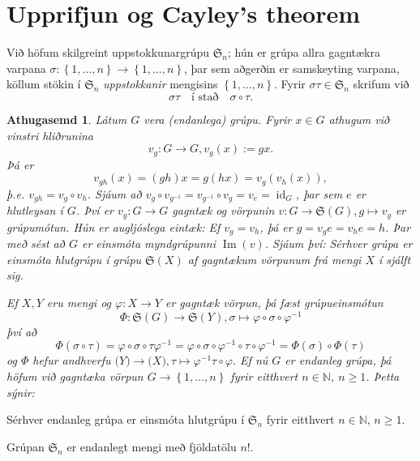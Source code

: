 \documentclass[a4paper,icelandic,11pt]{book}
\theoremstyle{plain}
\newtheorem*{ath}{Athugasemd}
\newcommand{\N}{\mathbb{N}}
\DeclareMathOperator{\id}{id} %
\DeclareMathOperator{\im}{Im} %
\begin{document}
\section{Upprifjun og Cayley's theorem}
Við höfum skilgreint
uppstokkunargrúpu
$\mathfrak S_n$; hún er grúpa allra gagntækra varpana $\sigma:\left\{ 1,\dots,n
\right\}\to\left\{ 1,\dots,n \right\}$, þar sem aðgerðin er samskeyting varpana,
köllum stökin í $\mathfrak S_n$ \emph{uppstokkanir} mengisins
$\left\{ 1,\dots,n \right\}$.  Fyrir $\sigma\tau\in \mathfrak S_n$ skrifum við 
\[
  \sigma\tau 
  \quad\text{í stað}\quad
  \sigma\circ\tau.
\]
\begin{ath}
  Látum $G$ vera (endanlega) grúpu. Fyrir $x\in G$ athugum við \emph{vinstri}
  hliðrunina
  \begin{equation*}
    v_g : G\to G, v_g(x) := gx.
  \end{equation*}
  Þá er 
  \begin{equation*}
    v_{gh}(x) = (gh)x = g(hx) = v_{g}(v_{h}(x)),
  \end{equation*}
  þ.e. $v_{gh} = v_g\circ v_h$. Sjáum að $v_g\circ v_{g^{-1}} = v_{g^{-1}}\circ
  v_{g} = v_e = \id_G$, þar sem $e$ er hlutleysan í $G$. Því er $v_g:G\to G$
  \emph{gagntæk} og vörpunin $v:G\to\mathfrak S(G), g\mapsto v_{g}$ er
  \emph{grúpumótun}. Hún er augljóslega eintæk: Ef $v_g = v_h$, þá er $g=v_g e =
  v_h e = h$. Þar með sést að $G$ er einsmóta myndgrúpunni $\im(v)$. Sjáum því:
  Sérhver grúpa er einsmóta hlutgrúpu í grúpu $\mathfrak S(X)$ af gagntækum
  vörpunum frá mengi $X$ í sjálft sig.

  Ef $X,Y$ eru mengi og $\varphi:X\to Y$ er gagntæk vörpun, þá fæst
  \emph{grúpueinsmótun}
  \begin{equation*}
    \Phi: \mathfrak S(G)\to \mathfrak S(Y), \sigma\mapsto
    \varphi\circ\sigma\circ\varphi^{-1}
  \end{equation*}
  því að 
  \begin{equation*}
    \Phi(\sigma\circ\tau)
    = \varphi\circ\sigma\circ\tau\varphi^{-1}
    = \varphi\circ\sigma\circ\varphi^{-1}\circ\tau\circ\varphi^{-1}
    = \Phi(\sigma)\circ\Phi(\tau)
  \end{equation*}
  og $\Phi$ hefur andhverfu $\mathfrak(Y)\to\mathfrak(X),
  \tau\mapsto\varphi^{-1}\tau\circ\varphi$. Ef nú $G$ er \emph{endanleg} grúpa,
  þá höfum við gagntæka vörpun $G\to\left\{ 1,\dots,n \right\}$ fyrir eitthvert
  $n\in\N$, $n\ge 1$. Þetta sýnir:
\end{ath}
\begin{setn}
  Sérhver endanleg grúpa er einsmóta hlutgrúpu í $\mathfrak S_n$ fyrir eitthvert
  $n\in\N$, $n\ge 1$.
\end{setn}
\begin{setn}
  Grúpan $\mathfrak S_n$ er endanlegt mengi með fjöldatölu $n!$.
\end{setn}
\end{document}
